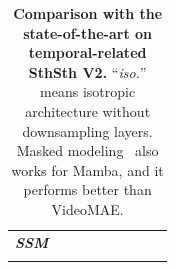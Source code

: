 \begin{table}[t]
{\begin{tabular}{l|l|c|l|r|r|r|cc}
             \hline
             \multirow{3}{*}{\textit{\textbf{SSM}}} & \cellcolor{blue!10}{\ModelName-M$_{800e}$} & \cellcolor{blue!10}{\cmark} & \cellcolor{blue!10}{\gray{CLIP-400M}} & \cellcolor{blue!10}{8$\times$224$^2$} & \cellcolor{blue!10}{74} & \cellcolor{blue!10}{101$\times$3$\times$2} & \cellcolor{blue!10}{70.2} & \cellcolor{blue!10}{92.6} \\
             ~ & \cellcolor{blue!10}{\ModelName-M$_{800e}$} & \cellcolor{blue!10}{\cmark} & \cellcolor{blue!10}{\gray{CLIP-400M}} & \cellcolor{blue!10}{16$\times$224$^2$} & \cellcolor{blue!10}{74} & \cellcolor{blue!10}{202$\times$3$\times$2} & \cellcolor{blue!10}{71.0} & \cellcolor{blue!10}{92.7} \\
             ~ & \cellcolor{blue!10}{\ModelName-M$_{800e}$} & \cellcolor{blue!10}{\cmark} & \cellcolor{blue!10}{\gray{CLIP-400M}} & \cellcolor{blue!10}{16$\times$288$^2$} & \cellcolor{blue!10}{74} & \cellcolor{blue!10}{333$\times$3$\times$2} & \cellcolor{blue!10}{\textbf{71.4}} & \cellcolor{blue!10}{\textbf{92.9}} \\
        \Xhline{1.0pt}	
        \end{tabular}
    }
    \caption{\textbf{Comparison with the state-of-the-art on temporal-related SthSth V2.} 
    ``\textit{iso.}'' means isotropic architecture without downsampling layers.
    Masked modeling~\cite{umt} also works for Mamba, 
    and it performs better than VideoMAE.
    }
    \label{results_ssv2}
    \vspace{-0.6cm}
\end{table}  
